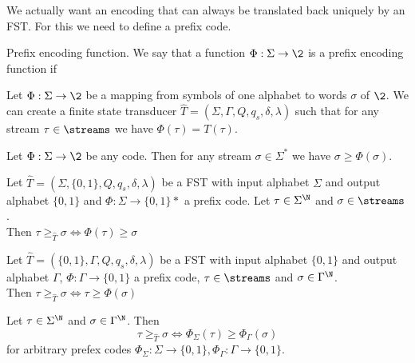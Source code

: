 We actually want an encoding that can always be translated back uniquely by an FST. For this we need to define a prefix code. 

\begin{definition}{Prefix encoding function.}
	We say that a function $\Phi: \Sigma \to \2$ is a prefix encoding function if
	
\end{definition}

\begin{lemma}\label{trans_code}
	Let $\Phi : \Sigma \to \2$ be a mapping from symbols of one alphabet to words $\sigma$ of $\2$. We can create a finite state transducer $\hat{T} = (\Sigma, \Gamma, Q,q_s,\delta,\lambda)$ such that for any stream $\tau \in \streams$ we have $\Phi(\tau) = T(\tau)$.
\end{lemma}

\begin{lemma}\label{apply_encoding}
	Let $\Phi: \Sigma \to \2$ be any code. Then for any stream $\sigma\in\Sigma^*$ we have $\sigma \geq \Phi(\sigma)$.
\end{lemma}

\begin{proposition}
	Let $\hat{T} = (\Sigma, \{0,1\}, Q,q_s,\delta,\lambda)$ be a FST with input alphabet $\Sigma$ and output alphabet $\{0,1\}$ and $\Phi : \Sigma \to \{0,1\}*$ a prefix code. Let $\tau \in \Sigma^\N$ and $\sigma \in \streams$.\\
	Then $\tau \geq_{\hat{T}} \sigma \iff \Phi(\tau) \geq \sigma$
\end{proposition}

\begin{proposition}
	Let $\hat{T} = (\{0,1\}, \Gamma, Q,q_s,\delta,\lambda)$ be a FST with input alphabet $\{0,1\}$ and output alphabet $\Gamma$, $\Phi : \Gamma \to \{0,1\}$ a prefix code, $\tau \in \streams$ and $\sigma \in \Gamma^{\N}$.\\
	Then $\tau \geq_{\hat{T}} \sigma \iff \tau \geq \Phi(\sigma)$
\end{proposition}

\begin{theorem}
	Let $\tau \in \Sigma^{\N}$ and $\sigma \in \Gamma^{\N}$. Then
	$$\tau \geq_{\hat{T}} \sigma \iff \Phi_{\Sigma}(\tau) \geq \Phi_{\Gamma}(\sigma)$$
	for arbitrary prefex codes $\Phi_\Sigma : \Sigma \to \{0,1\}, \Phi_\Gamma : \Gamma \to \{0,1\}$.
\end{theorem}

